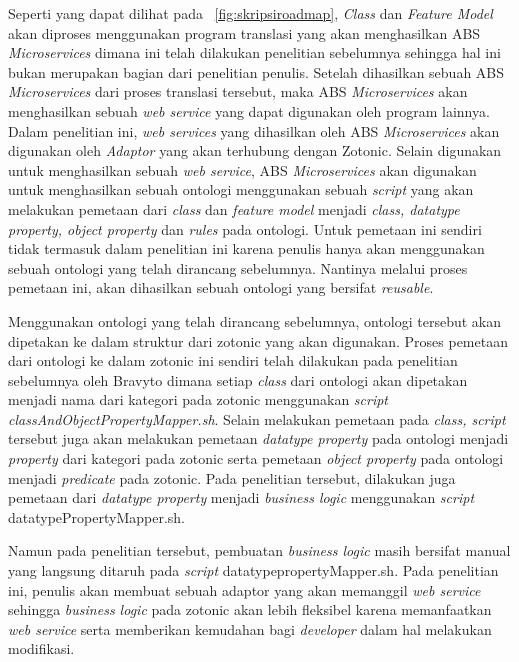 Seperti yang dapat dilihat pada \pic~\ref{fig:skripsiroadmap}, \textit{Class} dan \textit{Feature Model} akan diproses menggunakan program translasi yang akan menghasilkan ABS \textit{Microservices} dimana ini telah dilakukan penelitian sebelumnya sehingga hal ini bukan merupakan bagian dari penelitian penulis. Setelah dihasilkan sebuah ABS \textit{Microservices} dari proses translasi tersebut, maka ABS \textit{Microservices} akan menghasilkan sebuah \textit{web service} yang dapat digunakan oleh program lainnya. Dalam penelitian ini, \textit{web services} yang dihasilkan oleh ABS \textit{Microservices} akan digunakan oleh \textit{Adaptor} yang akan terhubung dengan Zotonic. Selain digunakan untuk menghasilkan sebuah \textit{web service}, ABS \textit{Microservices} akan digunakan untuk menghasilkan sebuah ontologi menggunakan sebuah \textit{script} yang akan melakukan pemetaan dari \textit{class} dan \textit{feature model} menjadi \textit{class, datatype property, object property} dan \textit{rules} pada ontologi. Untuk pemetaan ini sendiri tidak termasuk dalam penelitian ini karena penulis hanya akan menggunakan sebuah ontologi yang telah dirancang sebelumnya. Nantinya melalui proses pemetaan ini, akan dihasilkan sebuah ontologi yang bersifat \textit{reusable}.

Menggunakan ontologi yang telah dirancang sebelumnya, ontologi tersebut akan dipetakan ke dalam struktur dari zotonic yang akan digunakan. Proses pemetaan dari ontologi ke dalam zotonic ini sendiri telah dilakukan pada penelitian sebelumnya oleh Bravyto dimana setiap \textit{class} dari ontologi akan dipetakan menjadi nama dari kategori pada zotonic menggunakan \textit{script classAndObjectPropertyMapper.sh}. Selain melakukan pemetaan pada \textit{class, script} tersebut juga akan melakukan pemetaan \textit{datatype property} pada ontologi menjadi \textit{property} dari kategori pada zotonic serta pemetaan \textit{object property} pada ontologi menjadi \textit{predicate} pada zotonic. Pada penelitian tersebut, dilakukan juga pemetaan dari \textit{datatype property} menjadi \textit{business logic} menggunakan \textit{script} datatypePropertyMapper.sh.

Namun pada penelitian tersebut, pembuatan \textit{business logic} masih bersifat manual yang langsung ditaruh pada \textit{script} datatypepropertyMapper.sh. Pada penelitian ini, penulis akan membuat sebuah adaptor yang akan memanggil \textit{web service} sehingga \textit{business logic} pada zotonic akan lebih fleksibel karena memanfaatkan \textit{web service} serta memberikan kemudahan bagi \textit{developer} dalam hal melakukan modifikasi.
